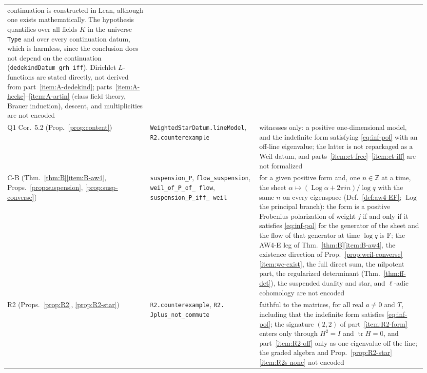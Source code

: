 \documentclass[11pt]{amsart}
\theoremstyle{plain}
\theoremstyle{definition}
\theoremstyle{remark}
\numberwithin{equation}{section}
\newcommand{\Z}{\mathbb{Z}}
\DeclareMathOperator{\tr}{tr}
\begin{document}
{\begin{longtable}{@{}>{\raggedright\arraybackslash}p{}
>{\raggedright\arraybackslash}p{}
>{\raggedright\arraybackslash}p{}@{}}
continuation is constructed in Lean, although one exists
mathematically. The
hypothesis quantifies over all fields $K$ in the universe \texttt{Type}
and over every continuation datum, which is harmless, since the
conclusion does not depend on
the continuation (\texttt{dedekindDatum\_\allowbreak{}grh\_\allowbreak{}iff}).
Dirichlet
$L$-functions are stated directly, not derived from
part~\ref{item:A-dedekind}; parts~\ref{item:A-hecke}--\ref{item:A-artin}
(class field theory, Brauer induction), descent, and multiplicities are
not encoded\\
Q1 Cor.~5.2 (Prop.~\ref{prop:content}) &
\texttt{WeightedStarDatum.\allowbreak{}lineModel},
\texttt{R2.\allowbreak{}counterexample} &
witnesses only: a positive one-dimensional model, and the indefinite
form satisfying \eqref{eq:inf-pol} with an off-line eigenvalue; the
latter is not repackaged as a Weil datum, and
parts~\ref{item:ct-free}--\ref{item:ct-iff} are not formalized\\
C-B (Thm.~\ref{thm:B}\ref{item:B-aw4},
Props.~\ref{prop:suspension}, \ref{prop:susp-converse}) &
\texttt{suspension\_\allowbreak{}P}, \texttt{flow\_\allowbreak{}suspension},
\texttt{weil\_\allowbreak{}of\_\allowbreak{}P\_\allowbreak{}of\_\allowbreak{}%
flow}, \texttt{suspension\_\allowbreak{}P\_\allowbreak{}iff\_\allowbreak{}%
weil} &
for a given positive form and, one $n\in\Z$ at a time, the sheet
$\alpha\mapsto(\operatorname{Log}\alpha+2\pi in)/\log q$ with the same
$n$ on every eigenspace (Def.~\ref{def:aw4-EF}; $\operatorname{Log}$
the principal branch): the form is a positive Frobenius polarization
of weight $j$ if and only if it satisfies \eqref{eq:inf-pol} for the
generator of the sheet and the flow of that generator at time $\log q$
is $\mathrm F$; the AW4-E leg of
Thm.~\ref{thm:B}\ref{item:B-aw4}, the existence direction of
Prop.~\ref{prop:weil-converse}\ref{item:wc-exist}, the full direct sum,
the nilpotent part, the regularized determinant
(Thm.~\ref{thm:ff-det}), the suspended duality and star, and
$\ell$-adic cohomology are not encoded\\
R2 (Props.~\ref{prop:R2}, \ref{prop:R2-star}) &
\texttt{R2.\allowbreak{}counterexample}, \texttt{R2.\allowbreak{}%
Jplus\_\allowbreak{}not\_\allowbreak{}commute} &
faithful to the matrices, for all real $a\ne0$ and $T$, including
that the indefinite form satisfies \eqref{eq:inf-pol}; the signature
$(2,2)$ of part~\ref{item:R2-form} enters only through $H^2=I$ and
$\tr H=0$, and part~\ref{item:R2-off} only as one eigenvalue off the
line; the graded
algebra and Prop.~\ref{prop:R2-star}\ref{item:R2s-none} not encoded\\

\end{longtable}}
\end{document}
